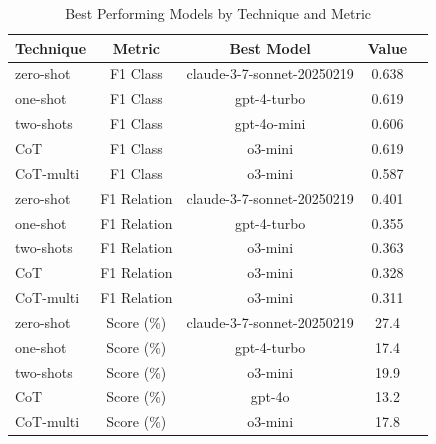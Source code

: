 \begin{table}[htbp]
\centering
\caption{Best Performing Models by Technique and Metric}
\begin{tabular}{lcccc}
\toprule
\textbf{Technique} & \textbf{Metric} & \textbf{Best Model} & \textbf{Value} \\
\midrule
zero-shot & F1 Class & claude-3-7-sonnet-20250219 & 0.638 \\
\midrule
one-shot & F1 Class & gpt-4-turbo & 0.619 \\
\midrule
two-shots & F1 Class & gpt-4o-mini & 0.606 \\
\midrule
CoT & F1 Class & o3-mini & 0.619 \\
\midrule
CoT-multi & F1 Class & o3-mini & 0.587 \\
\midrule
zero-shot & F1 Relation & claude-3-7-sonnet-20250219 & 0.401 \\
\midrule
one-shot & F1 Relation & gpt-4-turbo & 0.355 \\
\midrule
two-shots & F1 Relation & o3-mini & 0.363 \\
\midrule
CoT & F1 Relation & o3-mini & 0.328 \\
\midrule
CoT-multi & F1 Relation & o3-mini & 0.311 \\
\midrule
zero-shot & Score (\%) & claude-3-7-sonnet-20250219 & 27.4 \\
\midrule
one-shot & Score (\%) & gpt-4-turbo & 17.4 \\
\midrule
two-shots & Score (\%) & o3-mini & 19.9 \\
\midrule
CoT & Score (\%) & gpt-4o & 13.2 \\
\midrule
CoT-multi & Score (\%) & o3-mini & 17.8 \\
\bottomrule
\end{tabular}
\label{tab:best_models}
\end{table}